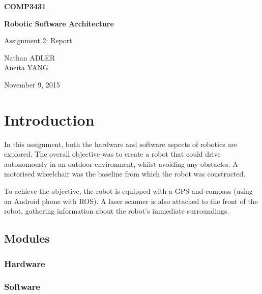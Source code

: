 \documentclass[titlepage,12pt,a4paper]{article}
\begin{document}
\begin{titlepage}
    \begin{center}
        \vspace*{3cm}
        
        \Huge
        \textbf{COMP3431\\}
        \title{}
        \vspace{0.5cm}
        \Huge
        \textbf{Robotic Software Architecture}
        
        \vspace{0.54cm}
        
        \Large
        Assignment 2: Report
        
        \vspace{5cm}

	\large
	Nathan ADLER\\
	Aneita YANG\\

	\vfill
        
        \Large
        November 9, 2015
        
    \end{center}
\end{titlepage}

\pagebreak
\tableofcontents

\pagebreak
\section{Introduction}
In this assignment, both the hardware and software aspects of robotics are explored. The overall objective was to create a robot that could drive autonomously in an outdoor environment, whilst avoiding any obstacles. A motorised wheelchair was the baseline from which the robot was constructed.

To achieve the objective, the robot is equipped with a GPS and compass (using an Android phone with ROS). A laser scanner is also attached to the front of the robot, gathering information about the robot's immediate surroundings.

\subsection{Modules}

\subsubsection{Hardware}


\subsubsection{Software}
\end{document}
